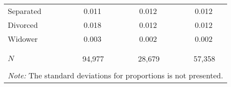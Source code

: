 \begin{table}[!htbp]
\begin{tabular}{llrrlrrlrr}
  \phantom{M}Separated &  & 0.011 &  &  & 0.012 &  &  & 0.012 &  \\ 
  \phantom{M}Divorced &  & 0.018 &  &  & 0.012 &  &  & 0.012 &  \\ 
  \phantom{M}Widower &  & 0.003 &  &  & 0.002 &  &  & 0.002 &  \\ 
    \\[-1.8ex] \hline \\[-1.8ex]  \multicolumn{2}{l}{ $ N $ }  &  \multicolumn{2}{c}{94,977} & & \multicolumn{2}{c}{28,679} & & \multicolumn{2}{c}{57,358} \\  \bottomrule   
 \\[-1.8ex] \multicolumn{10}{l}{\footnotesize{\textit{Note:} The standard deviations for proportions is 
               not presented.}} 
\end{tabular}
\end{table}
